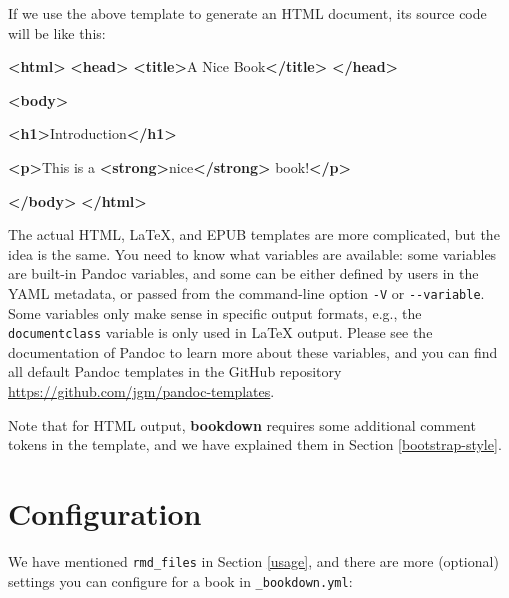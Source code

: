\documentclass[
  12pt,
]{krantz}
\newenvironment{Shaded}{\begin{snugshade}}{\end{snugshade}}
\newcommand{\KeywordTok}[1]{\textcolor[rgb]{0.13,0.29,0.53}{\textbf{#1}}}
\newcommand{\NormalTok}[1]{#1}
\theoremstyle{definition}
\theoremstyle{definition}
\theoremstyle{definition}
\theoremstyle{definition}
\theoremstyle{remark}
\begin{document}
If we use the above template to generate an HTML document, its source code will be like this:

\begin{Shaded}
\begin{Highlighting}[]
\KeywordTok{\textless{}html\textgreater{}}
  \KeywordTok{\textless{}head\textgreater{}}
    \KeywordTok{\textless{}title\textgreater{}}\NormalTok{A Nice Book}\KeywordTok{\textless{}/title\textgreater{}}
  \KeywordTok{\textless{}/head\textgreater{}}
  
  \KeywordTok{\textless{}body\textgreater{}}
  
  \KeywordTok{\textless{}h1\textgreater{}}\NormalTok{Introduction}\KeywordTok{\textless{}/h1\textgreater{}}
  
  \KeywordTok{\textless{}p\textgreater{}}\NormalTok{This is a }\KeywordTok{\textless{}strong\textgreater{}}\NormalTok{nice}\KeywordTok{\textless{}/strong\textgreater{}}\NormalTok{ book!}\KeywordTok{\textless{}/p\textgreater{}}
  
  \KeywordTok{\textless{}/body\textgreater{}}
\KeywordTok{\textless{}/html\textgreater{}}
\end{Highlighting}
\end{Shaded}

The actual HTML, LaTeX, and EPUB templates are more complicated, but the idea is the same. You need to know what variables are available: some variables are built-in Pandoc variables, and some can be either defined by users in the YAML metadata, or passed from the command-line option \texttt{-V} or \texttt{-\/-variable}. Some variables only make sense in specific output formats, e.g., the \texttt{documentclass} variable is only used in LaTeX output. Please see the documentation of Pandoc to learn more about these variables, and you can find all default Pandoc templates in the GitHub repository \url{https://github.com/jgm/pandoc-templates}.

Note that for HTML output, \textbf{bookdown} requires some additional comment tokens in the template, and we have explained them in Section \ref{bootstrap-style}.

\hypertarget{configuration}{%
\section{Configuration}\label{configuration}}

We have mentioned \texttt{rmd\_files} in Section \ref{usage}, and there are more (optional) settings you can configure for a book in \texttt{\_bookdown.yml}:
\end{document}
